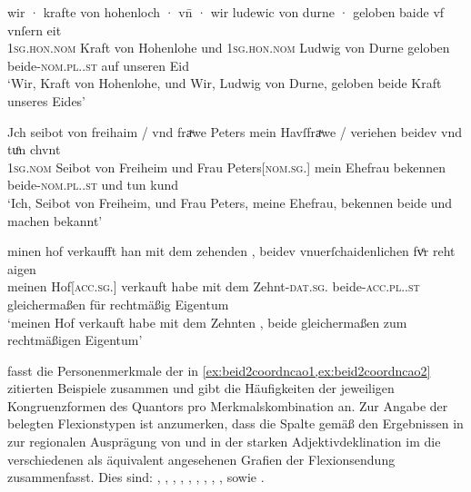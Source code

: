 \begin{exe}
\ex \label{ex:beid2coordncao2}
	\begin{xlist}
	\ex \label{ex:beid2coordncao2_1}
		\gll wir · krafte von hohenloch · vn̄ · wir ludewic
			von durne · geloben baide vf vnſern eit \\
			\textsc{1sg\subM.hon.nom} {} Kraft von Hohenlohe {} und {}
			\textsc{1sg\subM.hon.nom} Ludwig von Durne {} geloben
			beide-\textsc{nom.pl.\MascM.st} auf unseren Eid \\
		\trans `Wir, Kraft von Hohenlohe, und Wir, Ludwig von Durne,
			geloben beide Kraft unseres Eides'
			\parencites(Nr.~2529, Burg Hohlach, Kr.~Neustadt an der Aisch-Bad Windsheim)[563,5--6]{cao3}

	\ex \label{ex:beid2coordncao2_2}
		\gll Jch seibot von freihaim / vnd fraͮwe Peters mein
			Havſfraͮwe / veriehen beidev vnd tuͦn chvnt \\
			\textsc{1sg\subM.nom} Seibot von Freiheim {} und Frau
			Peters[\textsc{nom.sg.\FemF}] mein Ehefrau {} bekennen
			beide-\textsc{nom.pl.\NeutMF.st} und tun kund \\
		\trans `Ich, Seibot von Freiheim, und Frau Peters, meine Ehefrau,
			bekennen beide und machen bekannt'
			\parencites(Nr.~3248, München, 1299)[416,23]{cao4}

	\ex \label{ex:beid2coordncao2_3}
		\gll minen hof \textelp{} verkaufft han mit dem
			zehenden \textelp{}, beidev vnuerſchaidenlichen
			fvͤr reht aigen \\
			meinen Hof[\textsc{acc.sg.\MascI}] {} verkauft habe mit dem
			Zehnt-\textsc{dat.sg.\MascI} {} beide-\textsc{acc.pl.\NeutI.st}
			gleichermaßen für rechtmäßig Eigentum \\
		\trans `meinen Hof verkauft habe mit dem Zehnten \textelp{}, beide
			gleichermaßen zum rechtmäßigen Eigentum'
			\parencites(Nr.~N~241, Augsburg, 1283)[195,37--39]{cao5}
	\end{xlist}
\end{exe}

 fasst die Personenmerkmale der in
\cref{ex:beid2coordncao1,ex:beid2coordncao2} zitierten Beispiele zusammen und
gibt die Häufigkeiten der jeweiligen Kongruenzformen des Quantors pro
Merkmalskombination an. Zur Angabe der belegten Flexionstypen ist anzumerken,
dass die Spalte  gemäß den Ergebnissen in 
zur regionalen Ausprägung von  und  in der starken
Adjektivdeklination im \CAO{} die verschiedenen als äquivalent
angesehenen Grafien der Flexionsendung zusammenfasst. Dies sind:
,
,
,
,
,
,
,
,
,
sowie
.

